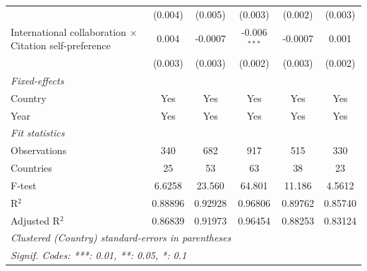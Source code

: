 \begin{table}[H]
\begin{tabular}{lccccc}
                                                                     & (0.004)       & (0.005)            & (0.003)        & (0.002)       & (0.003)\\   
      International collaboration $\times$ Citation self-preference  & 0.004         & -0.0007            & -0.006$^{***}$ & -0.0007       & 0.001\\   
                                                                     & (0.003)       & (0.003)            & (0.002)        & (0.003)       & (0.002)\\   
      \midrule
      \emph{Fixed-effects}\\
      Country                                                        & Yes           & Yes                & Yes            & Yes           & Yes\\  
      Year                                                           & Yes           & Yes                & Yes            & Yes           & Yes\\  
      \midrule
      \emph{Fit statistics}\\
      Observations                                                   & 340           & 682                & 917            & 515           & 330\\  
      Countries                                                      & 25            & 53                 & 63             & 38            & 23\\  
      F-test                                                         & 6.6258        & 23.560             & 64.801         & 11.186        & 4.5612\\  
      R$^2$                                                          & 0.88896       & 0.92928            & 0.96806        & 0.89762       & 0.85740\\  
      Adjusted R$^2$                                                 & 0.86839       & 0.91973            & 0.96454        & 0.88253       & 0.83124\\  
      \midrule \midrule
      \multicolumn{6}{l}{\emph{Clustered (Country) standard-errors in parentheses}}\\
      \multicolumn{6}{l}{\emph{Signif. Codes: ***: 0.01, **: 0.05, *: 0.1}}\\
   \end{tabular}
\end{table}


